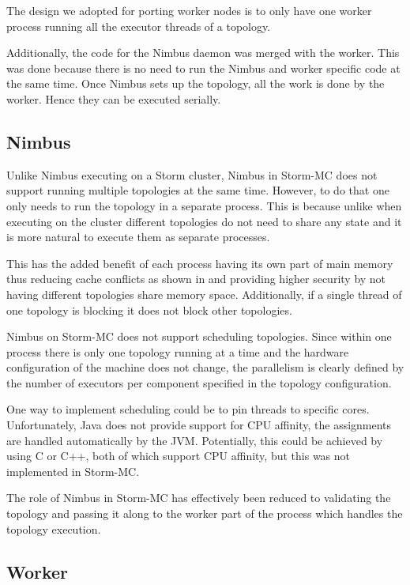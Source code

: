 The design we adopted for porting worker nodes is to only have one worker process running all the executor threads of a topology.

Additionally, the code for the Nimbus daemon was merged with the worker. This was done because there is no need to run the Nimbus and worker specific code at the same time. Once Nimbus sets up the topology, all the work is done by the worker. Hence they can be executed serially.

\subsection{Nimbus}

Unlike Nimbus executing on a Storm cluster, Nimbus in Storm-MC does not support running multiple topologies at the same time. However, to do that one only needs to run the topology in a separate process. This is because unlike when executing on the cluster different topologies do not need to share any state and it is more natural to execute them as separate processes.

This has the added benefit of each process having its own part of main memory thus reducing cache conflicts as shown in \citep{Chandra:2005:PIC:1042442.1043432} and providing higher security by not having different topologies share memory space. Additionally, if a single thread of one topology is blocking it does not block other topologies.

Nimbus on Storm-MC does not support scheduling topologies. Since within one process there is only one topology running at a time and the hardware configuration of the machine does not change, the parallelism is clearly defined by the number of executors per component specified in the topology configuration.

One way to implement scheduling could be to pin threads to specific cores. Unfortunately, Java does not provide support for CPU affinity, the assignments are handled automatically by the JVM. Potentially, this could be achieved by using C or C++, both of which support CPU affinity, but this was not implemented in Storm-MC.

The role of Nimbus in Storm-MC has effectively been reduced to validating the topology and passing it along to the worker part of the process which handles the topology execution.

\subsection{Worker}

